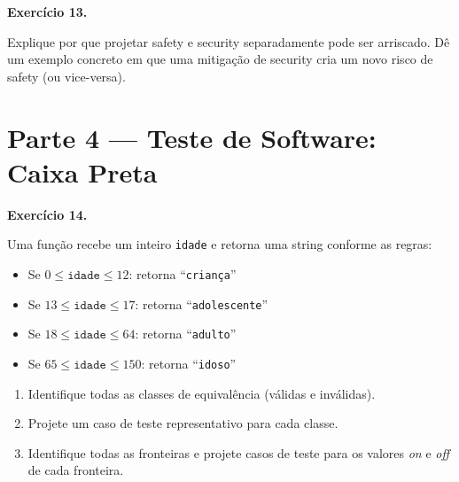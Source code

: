 \documentclass[12pt,a4paper]{article}
\newif\ifgabarito
\newcommand{\questao}[2][8]{%
  \needspace{#1\baselineskip}%
  \noindent\textbf{Exercício #2.}%
}
\begin{document}
\vspace{8pt}

\questao[5]{13}
Explique por que projetar safety e security separadamente pode ser arriscado. Dê um exemplo concreto em que uma mitigação de security cria um novo risco de safety (ou vice-versa).

\ifgabarito
\begin{tcolorbox}[gabarito]
Projetar separadamente ignora interações entre as duas propriedades: uma solução que melhora security pode criar gargalos ou pontos de falha que comprometem safety, e vice-versa.

\textbf{Exemplo}: um painel de controle industrial exige autenticação multifator para todos os comandos (security). Em uma emergência real, o delay ou falha da autenticação impede o acionamento imediato do desligamento de segurança (safety), podendo agravar o acidente. Solução: projetar um \textit{safety override} autenticado por canal físico independente.
\end{tcolorbox}
\fi

\section{Parte 4 --- Teste de Software: Caixa Preta}

\questao[12]{14}
Uma função recebe um inteiro \texttt{idade} e retorna uma string conforme as regras:
\begin{itemize}[nosep]
  \item Se $0 \leq \texttt{idade} \leq 12$: retorna ``\texttt{criança}''
  \item Se $13 \leq \texttt{idade} \leq 17$: retorna ``\texttt{adolescente}''
  \item Se $18 \leq \texttt{idade} \leq 64$: retorna ``\texttt{adulto}''
  \item Se $65 \leq \texttt{idade} \leq 150$: retorna ``\texttt{idoso}''
\end{itemize}
\begin{enumerate}[label=\alph*)]
  \item Identifique todas as classes de equivalência (válidas e inválidas).
  \item Projete um caso de teste representativo para cada classe.
  \item Identifique todas as fronteiras e projete casos de teste para os valores \textit{on} e \textit{off} de cada fronteira.
\end{enumerate}
\end{document}
